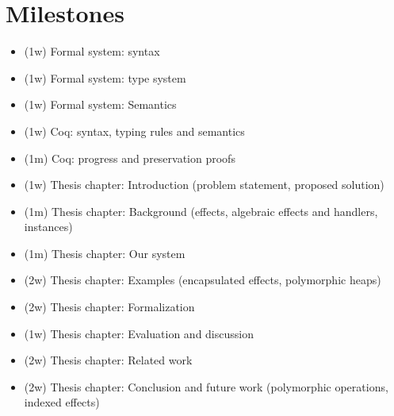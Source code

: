\documentclass[12pt]{article}
\begin{document}
\section{Milestones}
\begin{itemize}
\item (1w) Formal system: syntax
\item (1w) Formal system: type system
\item (1w) Formal system: Semantics
\item (1w) Coq: syntax, typing rules and semantics
\item (1m) Coq: progress and preservation proofs
\item (1w) Thesis chapter: Introduction (problem statement, proposed solution)
\item (1m) Thesis chapter: Background (effects, algebraic effects and handlers, instances)
\item (1m) Thesis chapter: Our system
\item (2w) Thesis chapter: Examples (encapsulated effects, polymorphic heaps)
\item (2w) Thesis chapter: Formalization
\item (1w) Thesis chapter: Evaluation and discussion
\item (2w) Thesis chapter: Related work
\item (2w) Thesis chapter: Conclusion and future work (polymorphic operations, indexed effects)
\end{itemize}
\end{document}
